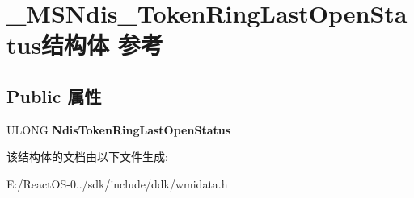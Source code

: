 \hypertarget{struct___m_s_ndis___token_ring_last_open_status}{}\section{\+\_\+\+M\+S\+Ndis\+\_\+\+Token\+Ring\+Last\+Open\+Status结构体 参考}
\label{struct___m_s_ndis___token_ring_last_open_status}
\subsection*{Public 属性}
\begin{DoxyCompactItemize}
\item 
\mbox{\label{struct___m_s_ndis___token_ring_last_open_status_a09c953ef0715991b50700c7212a2e7c6}} 
U\+L\+O\+NG {\bfseries Ndis\+Token\+Ring\+Last\+Open\+Status}
\end{DoxyCompactItemize}


该结构体的文档由以下文件生成\+:\begin{DoxyCompactItemize}
\item 
E\+:/\+React\+O\+S-\/0../sdk/include/ddk/wmidata.\+h\end{DoxyCompactItemize}
